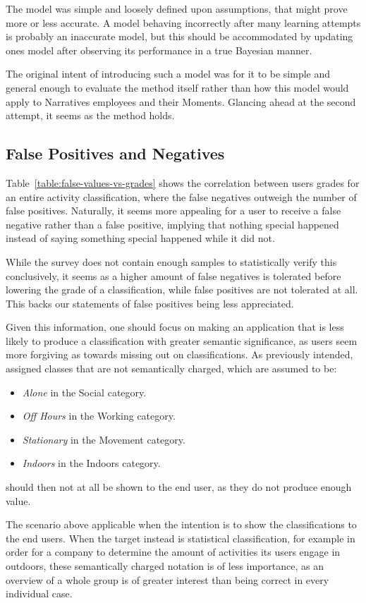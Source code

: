 The model was simple and loosely defined upon assumptions, that might
prove more or less accurate. A model behaving incorrectly after many
learning attempts is probably an inaccurate model, but this should be
accommodated by updating ones model after observing its performance
in a true Bayesian manner.

The original intent of introducing such a model was for it to be 
simple and general enough to evaluate the method itself rather than
how this model would apply to Narratives employees and their Moments. 
Glancing ahead at the second attempt, it seems as the method holds.

\subsection{False Positives and Negatives}
Table~\ref{table:false-values-vs-grades} shows the correlation between
users grades for an entire activity classification, where the false 
negatives outweigh the number of false positives. Naturally, it seems 
more appealing for a user to receive a false negative rather than 
a false positive, implying that nothing special happened instead of 
saying something special happened while it did not. 

While the survey does not contain enough samples to statistically verify
this conclusively, it seems as a higher amount of false negatives is 
tolerated before lowering the grade of a classification, while false
positives are not tolerated at all. This backs our statements of false
positives being less appreciated. 

Given this information, one should focus on making an application that 
is less likely to produce a classification with greater semantic 
significance, as users seem more forgiving as towards missing out on 
classifications. As previously intended, assigned classes that are 
not semantically charged, which are assumed to be:
\begin{itemize}
    \item \emph{Alone} in the Social category.
    \item \emph{Off Hours} in the Working category.
    \item \emph{Stationary} in the Movement category.
    \item \emph{Indoors} in the Indoors category. 
\end{itemize}
should then not at all be shown to the end user, as they do not produce
enough value.

The scenario above applicable when the intention is to show the 
classifications to the end users. When the target instead is statistical
classification, for example in order for a company to determine the 
amount of activities its users engage in outdoors, these semantically 
charged notation is of less importance, as an overview of a whole group
is of greater interest than being correct in every individual case. 

